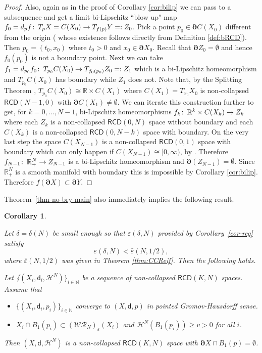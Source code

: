 \documentclass[a4paper]{amsart}
\theoremstyle{plain}
\newtheorem{corollary}[lemma]{Corollary}
\theoremstyle{definition}
\numberwithin{equation}{section}
\newcommand{\R}{\mathbb{R}}
\newcommand{\N}{\mathbb{N}}
\newcommand{\RCD}{\mathsf{RCD}}
\newcommand{\sfd}{\mathsf d}
\newcommand{\cH}{\mathcal{H}}
\newcommand{\eps}{\varepsilon}
\newcommand{\beps}{\bar \varepsilon}
\def\co{\colon\thinspace}
\newcommand{\cWR}{\mathcal{WR}}
\newcommand{\bRCD}{\boldsymbol\partial}
\begin{document}
{{\begin{proof}
Also, again as in the proof of Corollary \ref{cor:bilip} we can  pass to a subsequence and get a limit  bi-Lipschitz ``blow up" map  $f_0=d_{p} f\co T_pX=C(X_{0})\to T_{f(p)}Y=:Z_0$. Pick a point $p_0\in \bRCD C(X_0)$ different from the origin ({ whose existence follows directly from Definition \ref{def:bRCD}}). Then $p_0=(t_0, x_0)$ where $t_0>0$ and $x_0\in \bRCD X_0$. Recall that $\bRCD Z_0=\emptyset$ and hence $f_0(p_0)$ is not a boundary point. Next we can take
$f_1=d_{p_0}f_0\co T_{p_0}C(X_0)\to T_{f_0(p_0)}Z_0=: Z_1$ which is a bi-Lipschitz homeomorphism and $T_{p_0}C(X_0)$ has boundary while $Z_1$ does not. Note that, by the Splitting Theorem {\cite{giglisplittingshort}}, $T_{p_0}C(X_0)\cong \R\times C(X_1)$ where $C(X_1)=T_{x_0}X_0$ is non-collapsed $\RCD(N-1,0)$ { with $\bRCD C(X_{1})\neq \emptyset$}.  We can iterate this construction further to get, for $k=0,\ldots, N-1$, bi-Lipschitz homeomorphisms $f_k\co \R^k\times C(X_k)\to Z_k$ where each $Z_k$ is a non-collapsed $\RCD(0,N)$ space without boundary and each $C(X_k)$ is a non-collapsed $\RCD(0,N-k)$ space with boundary. On the very last step the space $C(X_{N-1})$ is a non-collapsed $\RCD(0,1)$ space with boundary which can only happen if  $C(X_{N-1})\cong [0,\infty)$,  by \cite{KL}.
Therefore $f_{N-1}\co \R^N_+\to Z_{N-1}$ is a bi-Lipschitz homeomorphism and $\bRCD(Z_{N-1})=\emptyset$. Since $\R^N_+$ is a smooth manifold with boundary this is impossible by Corollary \ref{cor:bilip}. Therefore $f(\bRCD X) \subset \bRCD Y$.



\end{proof}



Theorem~\ref{thm-no-bry-main}
also immediately implies the following result.


\begin{corollary}\label{thm-no-bry}

Let $\delta=\delta(N)$ be small enough so that $\eps(\delta,N)$ provided by Corollary~\ref{cor-reg} satisfy 
\[
\eps(\delta,N)<\beps(N,1/2),
\]
{ where $\beps(N,1/2)$ was given in Theorem \ref{thm:CCReif}}.
Then the following holds.

Let \{$(X_{i}, \sfd_{i}, \cH^{N})\}_{i\in \N}$ be a sequence of non-collapsed $\RCD(K,N)$ spaces. Assume that
\begin{itemize}
\item $\{(X_{i}, \sfd_{i}, p_{i})\}_{i\in \N}$ converge to  $(X, \sfd, p)$ in pointed Gromov-Hausdorff sense.
\item  $X_i\cap B_1(p_i)\subset (\cWR_N)_\eps(X_i)$   and $\cH^{N}(B_1(p_i))\ge v>0$ for all $i$.
\end{itemize}
Then $(X, \sfd, \cH^{N})$ is a non-collapsed $\RCD(K,N)$ space with  $\bRCD X \cap B_1(p)=\emptyset$.
\end{corollary}

}}
\end{document}
